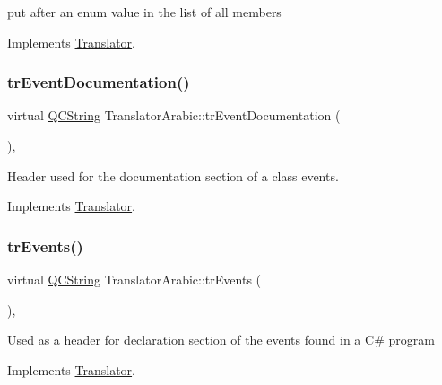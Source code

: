 put after an enum value in the list of all members 

Implements \mbox{\hyperlink{class_translator}{Translator}}.

\mbox{\label{class_translator_arabic_a32c79069b0baf68aa960fb12e5eccf69}} 
\subsubsection{\texorpdfstring{trEventDocumentation()}{trEventDocumentation()}}
{\footnotesize\ttfamily virtual \mbox{\hyperlink{class_q_c_string}{Q\+C\+String}} Translator\+Arabic\+::tr\+Event\+Documentation (\begin{DoxyParamCaption}{ }\end{DoxyParamCaption})\hspace{0.3cm}{\ttfamily [inline]}, {\ttfamily [virtual]}}

Header used for the documentation section of a class\textquotesingle{} events. 

Implements \mbox{\hyperlink{class_translator}{Translator}}.

\mbox{\label{class_translator_arabic_a22a39d424d0cb37428a7350d04e4448b}} 
\subsubsection{\texorpdfstring{trEvents()}{trEvents()}}
{\footnotesize\ttfamily virtual \mbox{\hyperlink{class_q_c_string}{Q\+C\+String}} Translator\+Arabic\+::tr\+Events (\begin{DoxyParamCaption}{ }\end{DoxyParamCaption})\hspace{0.3cm}{\ttfamily [inline]}, {\ttfamily [virtual]}}

Used as a header for declaration section of the events found in a \mbox{\hyperlink{class_c}{C}}\# program 

Implements \mbox{\hyperlink{class_translator}{Translator}}.

\mbox{\label{class_translator_arabic_afcb9a17ca0cf3e9a30bc8fcaa3eb0529}} 
